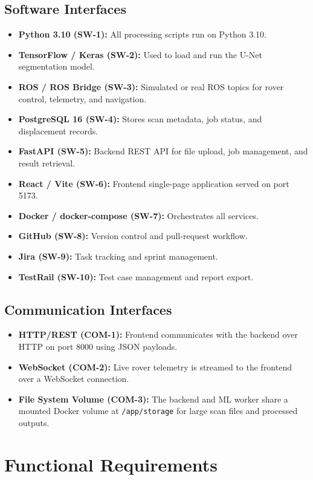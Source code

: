 \documentclass{article}
\begin{document}
\subsection{Software Interfaces}
\begin{itemize}
  \item \textbf{Python 3.10 (SW-1):} All processing scripts run on Python 3.10.
  \item \textbf{TensorFlow / Keras (SW-2):} Used to load and run the U-Net segmentation model.
  \item \textbf{ROS / ROS Bridge (SW-3):} Simulated or real ROS topics for rover control,
    telemetry, and navigation.
  \item \textbf{PostgreSQL 16 (SW-4):} Stores scan metadata, job status, and displacement
    records.
  \item \textbf{FastAPI (SW-5):} Backend REST API for file upload, job management, and result
    retrieval.
  \item \textbf{React / Vite (SW-6):} Frontend single-page application served on port 5173.
  \item \textbf{Docker / docker-compose (SW-7):} Orchestrates all services.
  \item \textbf{GitHub (SW-8):} Version control and pull-request workflow.
  \item \textbf{Jira (SW-9):} Task tracking and sprint management.
  \item \textbf{TestRail (SW-10):} Test case management and report export.
\end{itemize}

\subsection{Communication Interfaces}
\begin{itemize}
  \item \textbf{HTTP/REST (COM-1):} Frontend communicates with the backend over HTTP on port
    8000 using JSON payloads.
  \item \textbf{WebSocket (COM-2):} Live rover telemetry is streamed to the frontend over a
    WebSocket connection.
  \item \textbf{File System Volume (COM-3):} The backend and ML worker share a mounted Docker
    volume at \texttt{/app/storage} for large scan files and processed outputs.
\end{itemize}


\section{Functional Requirements}
\label{sec:functional}
\end{document}
